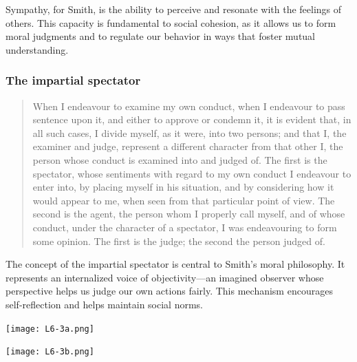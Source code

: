             \begin{remark}
                Sympathy, for Smith, is the ability to perceive and resonate with the feelings of others. This capacity is fundamental to social cohesion, as it allows us to form moral judgments and to regulate our behavior in ways that foster mutual understanding.
            \end{remark}

        \subsubsection{The impartial spectator}

            \begin{quote}
                When I endeavour to examine my own conduct, when I endeavour to pass sentence upon it, and either to approve or condemn it, it is evident that, in all such cases, I divide myself, as it were, into two persons; and that I, the examiner and judge, represent a different character from that other I, the person whose conduct is examined into and judged of. The first is the spectator, whose sentiments with regard to my own conduct I endeavour to enter into, by placing myself in his situation, and by considering how it would appear to me, when seen from that particular point of view. The second is the agent, the person whom I properly call myself, and of whose conduct, under the character of a spectator, I was endeavouring to form some opinion. The first is the judge; the second the person judged of.
            \end{quote}

            The concept of the impartial spectator is central to Smith’s moral philosophy. It represents an internalized voice of objectivity—an imagined observer whose perspective helps us judge our own actions fairly. This mechanism encourages self-reflection and helps maintain social norms.

            \begin{minipage}{0.48\textwidth}
                \begin{center}
                    \texttt{[image: L6-3a.png]}
                \end{center}
            \end{minipage}
            \begin{minipage}{0.04\textwidth}
                
            \end{minipage}
            \begin{minipage}{0.48\textwidth}
                \begin{center}
                    \texttt{[image: L6-3b.png]}
                \end{center}
            \end{minipage}

